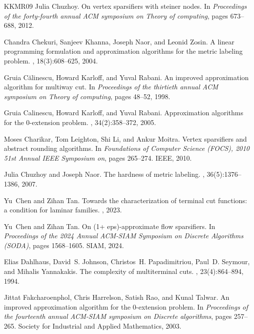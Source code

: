 \documentclass[11pt]{article}
\theoremstyle{definition}
\begin{document}
\begin{thebibliography}{KKMR09}
Julia Chuzhoy.
\newblock On vertex sparsifiers with steiner nodes.
\newblock In {\em Proceedings of the forty-fourth annual ACM symposium on
  Theory of computing}, pages 673--688, 2012.

Chandra Chekuri, Sanjeev Khanna, Joseph Naor, and Leonid Zosin.
\newblock A linear programming formulation and approximation algorithms for the
  metric labeling problem.
, 18(3):608--625, 2004.

Gruia C{\u{a}}linescu, Howard Karloff, and Yuval Rabani.
\newblock An improved approximation algorithm for multiway cut.
\newblock In {\em Proceedings of the thirtieth annual ACM symposium on Theory
  of computing}, pages 48--52, 1998.

Gruia Calinescu, Howard Karloff, and Yuval Rabani.
\newblock Approximation algorithms for the 0-extension problem.
, 34(2):358--372, 2005.

Moses Charikar, Tom Leighton, Shi Li, and Ankur Moitra.
\newblock Vertex sparsifiers and abstract rounding algorithms.
\newblock In {\em Foundations of Computer Science (FOCS), 2010 51st Annual IEEE
  Symposium on}, pages 265--274. IEEE, 2010.

Julia Chuzhoy and Joseph Naor.
\newblock The hardness of metric labeling.
, 36(5):1376--1386, 2007.

Yu~Chen and Zihan Tan.
\newblock Towards the characterization of terminal cut functions: a condition
  for laminar families.
, 2023.

Yu~Chen and Zihan Tan.
\newblock On (1+ eps)-approximate flow sparsifiers.
\newblock In {\em Proceedings of the 2024 Annual ACM-SIAM Symposium on Discrete
  Algorithms (SODA)}, pages 1568--1605. SIAM, 2024.

Elias Dahlhaus, David~S. Johnson, Christos~H. Papadimitriou, Paul~D. Seymour,
  and Mihalis Yannakakis.
\newblock The complexity of multiterminal cuts.
, 23(4):864--894, 1994.

Jittat Fakcharoenphol, Chris Harrelson, Satish Rao, and Kunal Talwar.
\newblock An improved approximation algorithm for the 0-extension problem.
\newblock In {\em Proceedings of the fourteenth annual ACM-SIAM symposium on
  Discrete algorithms}, pages 257--265. Society for Industrial and Applied
  Mathematics, 2003.


\end{thebibliography}
\end{document}
